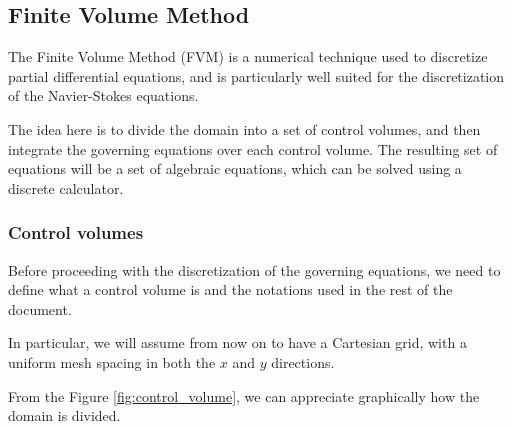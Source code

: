 \subsection{Finite Volume Method}
\label{subsec:finite_volume_method}

The Finite Volume Method (FVM) is a numerical technique used to discretize partial differential equations, and is particularly well suited for the discretization of the Navier-Stokes equations.

The idea here is to divide the domain into a set of control volumes, and then integrate the governing equations over each control volume.
The resulting set of equations will be a set of algebraic equations, which can be solved using a discrete calculator.


\subsubsection{Control volumes}

Before proceeding with the discretization of the governing equations, we need to define what a control volume is and the notations used in the rest of the document.

In particular, we will assume from now on to have a Cartesian grid, with a uniform mesh spacing in both the $x$ and $y$ directions.

From the Figure \ref{fig:control_volume}, we can appreciate graphically how the domain is divided.

